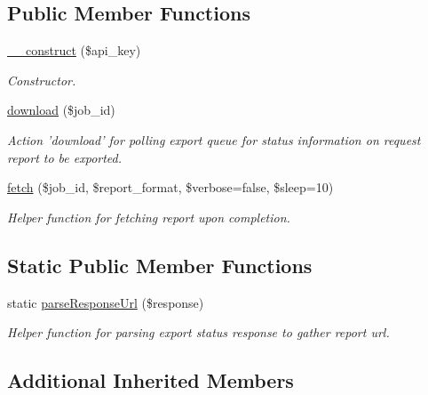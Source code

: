 \subsection*{Public Member Functions}
\begin{DoxyCompactItemize}
\item 
\hyperlink{classTune_1_1Management_1_1Api_1_1Export_ae0da76d04bd273a61ee783f175a20b4c}{\-\_\-\-\_\-construct} (\$api\-\_\-key)
\begin{DoxyCompactList}\small\item\em Constructor. \end{DoxyCompactList}\item 
\hyperlink{classTune_1_1Management_1_1Api_1_1Export_abb9910e7ee3bdc27a6539c43df751345}{download} (\$job\-\_\-id)
\begin{DoxyCompactList}\small\item\em Action 'download' for polling export queue for status information on request report to be exported. \end{DoxyCompactList}\item 
\hyperlink{classTune_1_1Management_1_1Api_1_1Export_a74e0a671e80521e1cdc85f56c9aa7b21}{fetch} (\$job\-\_\-id, \$report\-\_\-format, \$verbose=false, \$sleep=10)
\begin{DoxyCompactList}\small\item\em Helper function for fetching report upon completion. \end{DoxyCompactList}\end{DoxyCompactItemize}
\subsection*{Static Public Member Functions}
\begin{DoxyCompactItemize}
\item 
static \hyperlink{classTune_1_1Management_1_1Api_1_1Export_a5c7222ff46e3011908de6ad5e511ce4a}{parse\-Response\-Url} (\$response)
\begin{DoxyCompactList}\small\item\em Helper function for parsing export status response to gather report url. \end{DoxyCompactList}\end{DoxyCompactItemize}
\subsection*{Additional Inherited Members}


